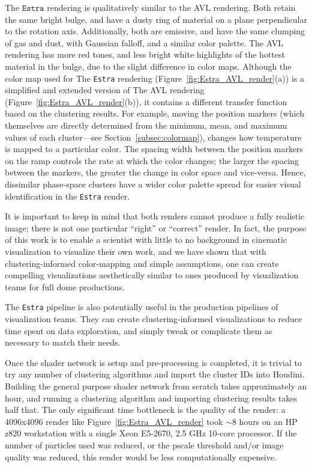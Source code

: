 \documentclass[fleqn,usenatbib,useAMS]{mnras}
\begin{document}
The $\texttt{Estra}$ rendering is qualitatively similar to the AVL rendering. Both retain the same bright bulge, and have a dusty ring of material on a plane perpendicular to the rotation axis. Additionally, both are emissive, and have the same clumping of gas and dust, with Gaussian falloff, and a similar color palette. The AVL rendering has more red tones, and less bright white highlights of the hottest material in the bulge, due to the slight difference in color maps. Although the color map used for The \texttt{Estra} rendering (Figure~\ref{fig:Estra_AVL_render}(a)) is a simplified and extended version of The AVL rendering (Figure~\ref{fig:Estra_AVL_render}(b)), it contains a different transfer function based on the clustering results. For example, moving the position markers (which themselves are directly determined from the minimum, mean, and maximum values of each cluster---see Section~\ref{subsec:colormap}), changes how temperature is mapped to a particular color. The spacing width between the position markers on the ramp controls the rate at which the color changes; the larger the spacing between the markers, the greater the change in color space and vice-versa. Hence, dissimilar phase-space clusters have a wider color palette spread for easier visual identification in the \texttt{Estra} render. \par

It is important to keep in mind that both renders cannot produce a fully realistic image; there is not one particular ``right'' or ``correct'' render. In fact, the purpose of this work is to enable a scientist with little to no background in cinematic visualization to visualize their own work, and we have shown that with clustering-informed color-mapping and simple assumptions, one can create compelling visualizations aesthetically similar to ones produced by visualization teams for full dome productions. \par

The \texttt{Estra} pipeline is also potentially useful in the production pipelines of visualization teams. They can create clustering-informed visualizations to reduce time spent on data exploration, and simply tweak or complicate them as necessary to match their needs. \par

Once the shader network is setup and pre-processing is completed, it is trivial to try any number of clustering algorithms and import the cluster IDs into Houdini. Building the general purpose shader network from scratch takes approximately an hour, and running a clustering algorithm and importing clustering results takes half that. The only significant time bottleneck is the quality of the render: a 4096x4096 render like Figure~\ref{fig:Estra_AVL_render} took $\sim$8 hours on an HP z820 workstation with a single Xeon E5-2670, 2.5 GHz 10-core processor. If the number of particles used was reduced, or the pscale threshold and/or image quality was reduced, this render would be less computationally expensive. \par
\end{document}
